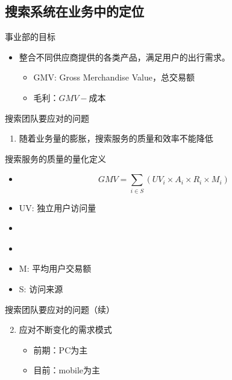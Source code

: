 \documentclass{beamer}
\begin{document}
\begin{CJK}{UTF8}{gbsn}
\section{搜索系统在业务中的定位}


\begin{frame}{事业部的目标}
  \begin{itemize}
  \item { 整合不同供应商提供的各类产品，满足用户的出行需求。
    \begin{itemize}
      \item<2-> { GMV: Gross Merchandise Value，总交易额 }
      \item<2-> { 毛利：$GMV - \text{成本} $ }
    \end{itemize}
  }
  \end{itemize}
\end{frame}

\begin{frame}{搜索团队要应对的问题}
  \begin{enumerate}
    \item { 随着业务量的膨胀，搜索服务的质量和效率不能降低 }
  \end{enumerate}
   {
    \begin{center}
      \plotGMVGrowthChart
    \end{center}
  }
\end{frame}


\begin{frame}{搜索服务的质量的量化定义}
  \begin{itemize}
  \item { $$ GMV = \sum_{i \in S}{(UV_i \times A_i \times R_i \times M_i)} $$ }
  \item { UV: 独立用户访问量 }
  \item { \color{blue}{ A: 服务可用率 } }
  \item { \color{blue}{ R: UV至订单转化率 } }
  \item { M: 平均用户交易额 }
  \item { S: 访问来源 }
  \end{itemize}
\end{frame}

\begin{frame}{搜索团队要应对的问题（续）}
  \begin{enumerate}\setcounter{enumi}{1}
  \item {
    应对不断变化的需求模式
    \begin{itemize}
      \item { 前期：PC为主 }
      \item { 目前：mobile为主 }
    \end{itemize}
  }
  \end{enumerate}
\end{frame}



\end{CJK}
\end{document}
